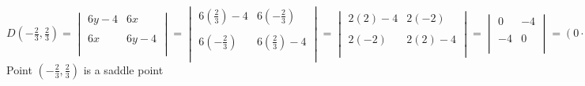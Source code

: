 \documentclass{article}
\begin{document}
\begin{enumerate}[14.]
\\
$D(-\frac{2}{3},\frac{2}{3})= \begin{vmatrix}
6y-4&6x\\\\
6x&6y-4\\\\
\end{vmatrix}=\begin{vmatrix}
6(\frac{2}{3})-4&6(-\frac{2}{3})\\\\
6(-\frac{2}{3})&6(\frac{2}{3})-4\\\\
\end{vmatrix}=\begin{vmatrix}
2(2)-4&2(-2)\\\\
2(-2)&2(2)-4\\\\
\end{vmatrix}=\begin{vmatrix}
0&-4\\\\
-4&0\\\\
\end{vmatrix}=(0\cdot0)-(-4\cdot-4)=0-16=-16$
\\Point $(-\frac{2}{3},\frac{2}{3})$ is a saddle point\\
\end{enumerate}
\end{document}
